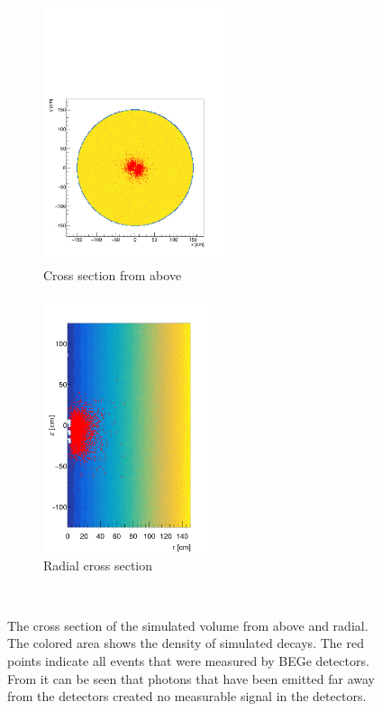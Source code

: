 \documentclass[encoding=utf8,british]{tumphthesis}
\begin{document}
\begin{figure}[t!]
	\centering
	\begin{subfigure}{.5\textwidth}
		\centering
		\includegraphics[height=75mm]{./Bilder/MC-Querschnitt-BEGes.pdf}
		\caption{Cross section from above}
		\label{fig:CrossSecAb}
	\end{subfigure}\hfill%
	\begin{subfigure}{.5\textwidth}
		\centering
		\includegraphics[height=75mm]{./Bilder/MC-Radius-BEGes.png}
		\caption{Radial cross section}
		\label{fig:CrossSecRa}
	\end{subfigure}
    \\
	\vspace{0.5cm}
    \caption{
    	The cross section of the simulated volume from above and radial.
    	The colored area shows the density of simulated decays. 
    	The red points indicate all events that were measured by BEGe detectors.
    	From it can be seen that photons that have been emitted far away from the detectors created no measurable signal in the detectors.
    	}
\vspace{0.5cm}
\end{figure}
\\
\end{document}
